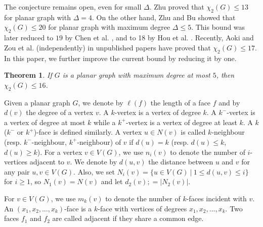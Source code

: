 \documentclass[12pt, reqno]{amsart}
\theoremstyle{plain}
\newtheorem{theorem}[equation]{Theorem}
\theoremstyle{definition}
\numberwithin{equation}{section}
\newcommand{\D}{\Delta}
\begin{document}




The conjecture remains open, even for small $\D$. Zhu \cite{zhu} proved that $\chi_2(G)\leq 13$ for planar graph with $\D =4$. On the other hand,  Zhu and Bu \cite{zhu2} showed that  $\chi_2(G)\leq 20$ for planar graph with maximum degree $\D \leq 5$. This bound was later reduced to $19$ by Chen et al. \cite{chen}, and to 18 by Hou et al. \cite{hou}. Recently, Aoki \cite{aoki} and Zou et al. \cite{zou} (independently) in unpublished papers have proved that $\chi_2(G)\leq 17$.    In this paper, we further improve the current bound by reducing it by one.



\begin{theorem}\label{thm:main}
If $G$ is a planar graph with maximum degree at most $5$, then $\chi_2(G) \leq 16$. 
\end{theorem}







Given a planar  graph $G$, %
we denote by $\ell(f)$ the length of a face $f$ and by $d(v)$ the degree of a vertex $v$. 
A $k$-vertex is a vertex of degree $k$. A $k^{-}$-vertex is a vertex of degree at most $k$ while a $k^{+}$-vertex is a vertex of degree at least $k$. A $k$ ($k^-$ or $k^+$)-face is defined similarly. A vertex $u\in N(v)$ is called $k$-neighbour (resp. $k^-$-neighbour, $k^+$-neighbour) of $v$ if $d(u)=k$ (resp. $d(u)\leq k$, $d(u)\geq k$). 
For a vertex $v\in V(G)$, we use $n_i(v)$ to denote the number of $i$-vertices adjacent to $v$. %
We denote by $d(u,v)$ the distance between $u$ and $v$ for any pair $u,v\in V(G)$. Also, we set $N_i(v)=\{u\in V(G) \ | \  1 \leq d(u,v) \leq i \}$ for $i\geq 1$, so $N_1(v)=N(v)$ and let $d_2(v);=|N_2(v)|$.


For $v \in V(G)$, we use $m_k(v)$ to denote the number of $k$-faces incident with $v$.
An $(x_1,x_2,\ldots,x_k)$-face is a $k$-face with vertices of degrees $x_1,x_2,\ldots,x_k$.
Two faces $f_1 $ and $f_2$ are called adjacent if they share a common edge.
\end{document}
